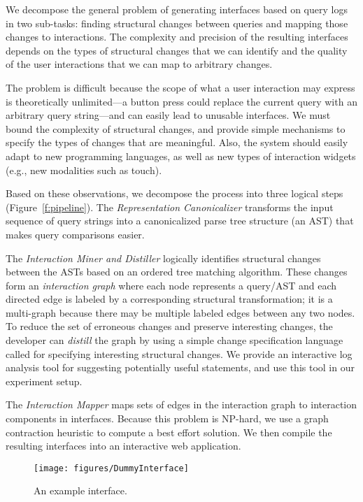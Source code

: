 We decompose the general problem of generating interfaces based on query logs in two sub-tasks: finding structural changes between queries and mapping those changes to interactions. The complexity and precision of the resulting interfaces depends on the types of structural changes that we can identify and the quality of the user interactions that we can map to arbitrary changes.

The problem is difficult because the scope of what a user interaction may express is theoretically unlimited---a button press could replace the current query with an arbitrary query string---and can easily lead to unusable interfaces.  We must bound the complexity of structural changes, and provide simple mechanisms to specify the types of changes that are meaningful.  Also, the system should easily adapt to new programming languages, as well as new types of interaction widgets (e.g., new modalities such as touch).

Based on these observations, we decompose the \sys process into three logical steps (Figure~\ref{f:pipeline}). The {\it Representation Canonicalizer} transforms the input sequence of query strings into a canonicalized parse tree structure (an AST) that makes query comparisons easier.

The {\it Interaction Miner and Distiller} logically identifies structural changes between the ASTs based on an ordered tree matching algorithm. These changes form an {\it interaction graph} where each node represents a query/AST and each directed edge is labeled by a corresponding structural transformation; it is a multi-graph because there may be multiple labeled edges between any two nodes.   To reduce the set of erroneous changes and preserve interesting changes, the developer can {\it distill} the graph by using a simple change specification language called \lang for specifying interesting structural changes.  We provide an interactive log analysis tool for suggesting potentially useful \lang statements, and use this tool in our experiment setup.

The {\it Interaction Mapper} maps sets of edges in the interaction graph to interaction components in interfaces.  Because this problem is NP-hard, we use a graph contraction heuristic to compute a best effort solution.  We then compile the resulting interfaces into an interactive web application.

\begin{figure}[ht]
\centering
\texttt{[image: figures/DummyInterface]}
\caption{An example interface.}
\label{f:dummy}
\end{figure}


